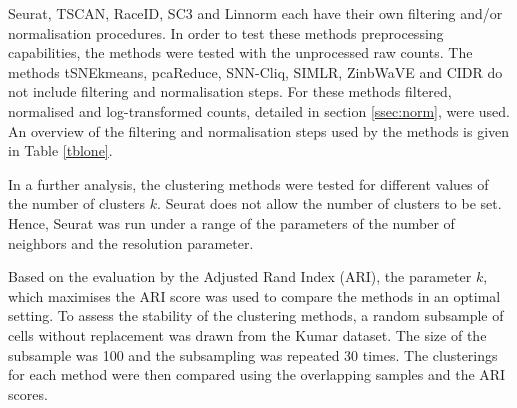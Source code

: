 \documentclass[12pt, a4paper]{article}\usepackage[]{graphicx}\usepackage[]{color}
\begin{document}
Seurat, TSCAN, RaceID, SC3 and Linnorm each have their own filtering and/or normalisation procedures. In order to test these methods preprocessing capabilities, the methods were tested with the unprocessed raw counts.
The methods tSNEkmeans, pcaReduce, SNN-Cliq, SIMLR, ZinbWaVE and CIDR do not include filtering and normalisation steps. For these methods filtered, normalised and log-transformed counts, detailed in section \ref{ssec:norm}, were used. An overview of the filtering and normalisation steps used by the methods is given in Table \ref{tblone}.

In a further analysis, the clustering methods were tested for different values of the number of clusters $k$. Seurat does not allow the number of clusters to be set. Hence, Seurat was run under a range of the parameters of the number of neighbors and the resolution parameter.

Based on the evaluation by the Adjusted Rand Index (ARI), the parameter $k$, which maximises the ARI score was used to compare the methods in an optimal setting. To assess the stability of the clustering methods, a random subsample of cells without replacement was drawn from the Kumar dataset. The size of the subsample was 100 and the subsampling was repeated 30 times. The clusterings for each method were then compared using the overlapping samples and the ARI scores.  
\end{document}
